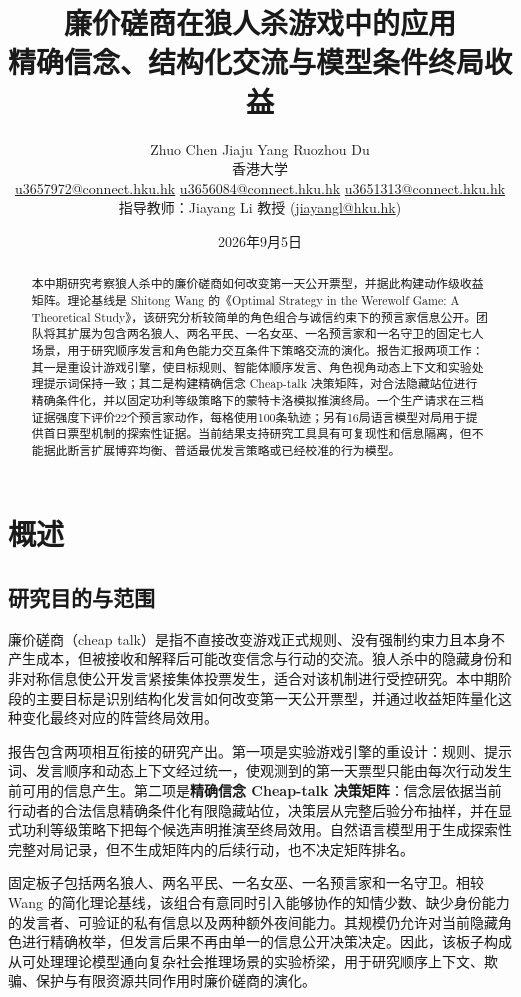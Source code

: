 \documentclass[UTF8,11pt,a4paper,fontset=windows]{ctexart}
\title{\bfseries 廉价磋商在狼人杀游戏中的应用\\[0.4em]
\large 精确信念、结构化交流与模型条件终局收益}
\author{%
Zhuo Chen \quad Jiaju Yang \quad Ruozhou Du\\
\small 香港大学\\
\footnotesize\href{mailto:u3657972@connect.hku.hk}{u3657972@connect.hku.hk} \quad
\href{mailto:u3656084@connect.hku.hk}{u3656084@connect.hku.hk} \quad
\href{mailto:u3651313@connect.hku.hk}{u3651313@connect.hku.hk}\\[0.35em]
\small 指导教师：Jiayang Li 教授
(\href{mailto:jiayangl@hku.hk}{jiayangl@hku.hk})}
\date{2026年9月5日}
\newcommand{\term}[1]{\textbf{#1}}
\begin{document}
\maketitle

\begin{abstract}
本中期研究考察狼人杀中的廉价磋商如何改变第一天公开票型，并据此构建动作级收益矩阵。理论基线是 Shitong Wang 的《Optimal Strategy in the Werewolf Game: A Theoretical Study》，该研究分析较简单的角色组合与诚信约束下的预言家信息公开。团队将其扩展为包含两名狼人、两名平民、一名女巫、一名预言家和一名守卫的固定七人场景，用于研究顺序发言和角色能力交互条件下策略交流的演化。报告汇报两项工作：其一是重设计游戏引擎，使目标规则、智能体顺序发言、角色视角动态上下文和实验处理提示词保持一致；其二是构建精确信念 Cheap-talk 决策矩阵，对合法隐藏站位进行精确条件化，并以固定功利等级策略下的蒙特卡洛模拟推演终局。一个生产请求在三档证据强度下评价22个预言家动作，每格使用100条轨迹；另有16局语言模型对局用于提供首日票型机制的探索性证据。当前结果支持研究工具具有可复现性和信息隔离，但不能据此断言扩展博弈均衡、普适最优发言策略或已经校准的行为模型。
\end{abstract}

\section{概述}

\subsection{研究目的与范围}

廉价磋商（cheap talk）是指不直接改变游戏正式规则、没有强制约束力且本身不产生成本，但被接收和解释后可能改变信念与行动的交流。狼人杀中的隐藏身份和非对称信息使公开发言紧接集体投票发生，适合对该机制进行受控研究。本中期阶段的主要目标是识别结构化发言如何改变第一天公开票型，并通过收益矩阵量化这种变化最终对应的阵营终局效用。

报告包含两项相互衔接的研究产出。第一项是实验游戏引擎的重设计：规则、提示词、发言顺序和动态上下文经过统一，使观测到的第一天票型只能由每次行动发生前可用的信息产生。第二项是\term{精确信念 Cheap-talk 决策矩阵}：信念层依据当前行动者的合法信息精确条件化有限隐藏站位，决策层从完整后验分布抽样，并在显式功利等级策略下把每个候选声明推演至终局效用。自然语言模型用于生成探索性完整对局记录，但不生成矩阵内的后续行动，也不决定矩阵排名。

固定板子包括两名狼人、两名平民、一名女巫、一名预言家和一名守卫。相较 Wang 的简化理论基线，该组合有意同时引入能够协作的知情少数、缺少身份能力的发言者、可验证的私有信息以及两种额外夜间能力。其规模仍允许对当前隐藏角色进行精确枚举，但发言后果不再由单一的信息公开决策决定。因此，该板子构成从可处理理论模型通向复杂社会推理场景的实验桥梁，用于研究顺序上下文、欺骗、保护与有限资源共同作用时廉价磋商的演化。
\end{document}
